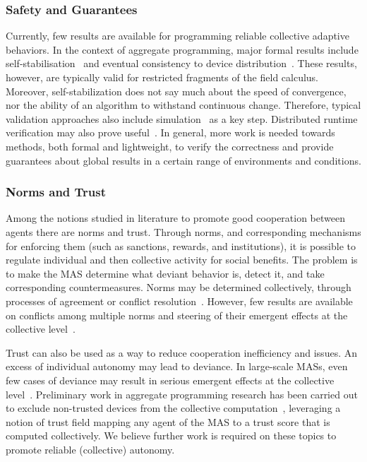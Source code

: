 \documentclass[jsan,article,accept,moreauthors,pdftex]{Definitions/mdpi}
\begin{document}
\begin{paracol}{2}
\subsubsection{Safety and Guarantees}

Currently, few results are available 
 for programming reliable collective adaptive behaviors.
%
In the context of aggregate programming,
 major formal results 
 include self-stabilisation~\cite{DBLP:journals/tomacs/ViroliABDP18}
 and eventual consistency to device distribution~\cite{DBLP:journals/taas/BealVPD17}.
%
These results, however, are typically valid for restricted fragments of the field calculus.
%
Moreover, 
 self-stabilization does not say much about
 the speed of convergence,
 nor the ability of an algorithm to withstand continuous change.
%
Therefore, 
 typical validation approaches also include
 simulation~\cite{mittal2017simulation-cas} as a key step.
%
Distributed runtime verification may also prove useful~\cite{audrito2021drv-slcs-fc}.
%
In general, more work is needed 
 towards methods, both formal and lightweight,
 to verify the correctness and provide guarantees
 about global results in a certain range of environments
 and conditions.


\subsubsection{Norms and Trust}

Among the notions 
 studied in literature
 to promote good cooperation between agents 
 there are {norms} and {trust}.
%
Through norms, and corresponding mechanisms for 
 enforcing them (such as sanctions, rewards, and institutions),
 it is possible to regulate individual and then collective activity
 for social benefits.
%
The problem is to make the MAS determine what deviant behavior is,
 detect it, and take corresponding countermeasures.
%
Norms may be determined collectively,
 through processes of agreement
 or conflict resolution~\cite{DBLP:journals/aamas/SantosZSSV17}.
%
However, few results are available on conflicts among multiple norms
 and steering of their emergent effects at the collective level~\cite{DBLP:journals/aamas/SantosZSSV17}.

Trust can also be used as a way to reduce cooperation inefficiency and issues.
%
An excess of individual autonomy 
 may lead to deviance.
%
In large-scale MASs,
 even few cases of deviance may result in 
 serious emergent effects at the collective level~\cite{DBLP:journals/tomacs/Aldini18}.
%
Preliminary work in aggregate programming research
 has been carried out
 to exclude non-trusted devices
 from the collective computation~\cite{casadei2018scp},
 leveraging a notion of {trust field} 
 mapping any agent of the MAS to a trust score
 that is computed collectively.
%
We believe further work is required on these topics
 to promote reliable (collective) autonomy.


\end{paracol}
\end{document}
